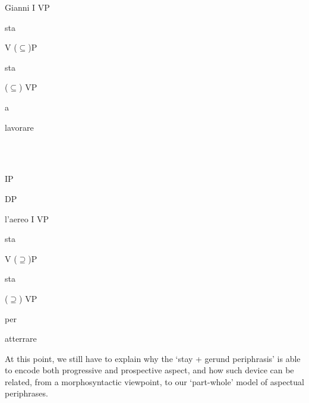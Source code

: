 \documentclass[output=paper,colorlinks,citecolor=brown]{./langscibook}
\begin{document}
             Gianni          I                       VP

                                sta

                                            V                         (${\subseteq}$)P

                                           sta

                                                           (${\subseteq}$)                    VP

                                                             a                    

                                                                                 lavorare

\ea%
    \label{ex:key:26}
    \gll\\
        \\
    \glt
    \z

                                    IP

                  DP 

             l’aereo          I                       VP

                                 sta

                                            V                         (${\supseteq}$)P

                                           sta

                                                           (${\supseteq}$)                    VP

                                                           per                    

                                                                                 atterrare

At this point, we still have to explain why the ‘stay + gerund periphrasis’ is able to encode both progressive and prospective aspect, and how such device can be related, from a morphosyntactic viewpoint, to our ‘part-whole’ model of aspectual periphrases.
\end{document}
